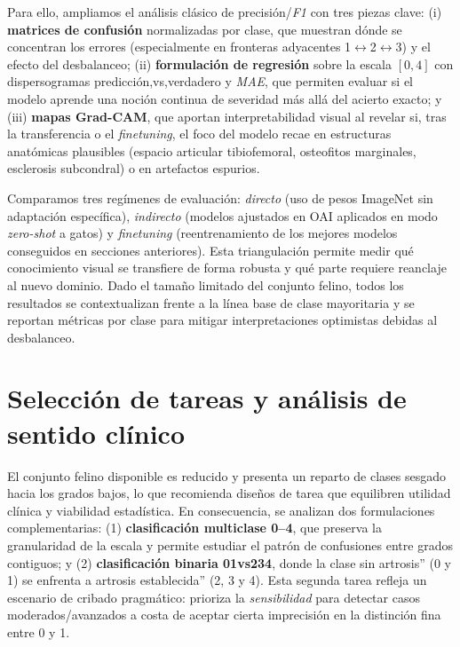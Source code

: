 \documentclass[11pt,spanish,listoffigures,listoftables]{tfgetsinf}
\begin{document}
Para ello, ampliamos el análisis clásico de precisión/\emph{F1} con tres piezas clave: (i) \textbf{matrices de confusión} normalizadas por clase, que muestran dónde se concentran los errores (especialmente en fronteras adyacentes 1$\leftrightarrow$2$\leftrightarrow$3) y el efecto del desbalanceo; (ii) \textbf{formulación de regresión} sobre la escala $[0,4]$ con dispersogramas predicción,vs,verdadero y \emph{MAE}, que permiten evaluar si el modelo aprende una noción continua de severidad más allá del acierto exacto; y (iii) \textbf{mapas Grad-CAM}, que aportan interpretabilidad visual al revelar si, tras la transferencia o el \emph{finetuning}, el foco del modelo recae en estructuras anatómicas plausibles (espacio articular tibiofemoral, osteofitos marginales, esclerosis subcondral) o en artefactos espurios.

Comparamos tres regímenes de evaluación: \emph{directo} (uso de pesos ImageNet sin adaptación específica), \emph{indirecto} (modelos ajustados en OAI aplicados en modo \emph{zero-shot} a gatos) y \emph{finetuning} (reentrenamiento de los mejores modelos conseguidos en secciones anteriores). Esta triangulación permite medir qué conocimiento visual se transfiere de forma robusta y qué parte requiere reanclaje al nuevo dominio. Dado el tamaño limitado del conjunto felino, todos los resultados se contextualizan frente a la línea base de clase mayoritaria y se reportan métricas por clase para mitigar interpretaciones optimistas debidas al desbalanceo.

\section{Selección de tareas y análisis de sentido clínico}

El conjunto felino disponible es reducido y presenta un reparto de clases sesgado hacia los grados bajos, lo que recomienda diseños de tarea que equilibren utilidad clínica y viabilidad estadística. En consecuencia, se analizan dos formulaciones complementarias: (1) \textbf{clasificación multiclase 0--4}, que preserva la granularidad de la escala y permite estudiar el patrón de confusiones entre grados contiguos; y (2) \textbf{clasificación binaria 01vs234}, donde la clase sin artrosis'' (0 y 1) se enfrenta a artrosis establecida'' (2, 3 y 4). Esta segunda tarea refleja un escenario de cribado pragmático: prioriza la \emph{sensibilidad} para detectar casos moderados/avanzados a costa de aceptar cierta imprecisión en la distinción fina entre 0 y 1.
\end{document}

